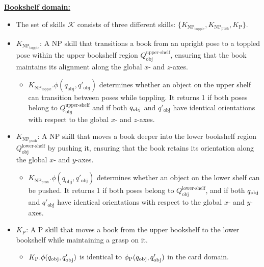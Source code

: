 \underline{\textbf{Bookshelf domain:}} \label{env:bookshelf_skill_descript}
\begin{itemize}
        \item[] The set of skills \(\mathcal{K}\) consists of three different skills: \(\{ K_{\text{NP}_\text{topple}}, K_{\text{NP}_\text{push}}, K_\text{P}\}\). \label{skill:bookshelf_library}
        \item \(K_{\text{NP}_\text{topple}}\): A NP skill that transitions a book from an upright pose to a toppled pose within the upper bookshelf region \(Q^\text{upper-shelf}_\text{obj}\), ensuring that the book maintains its alignment along the global \( x \)- and \( z \)-axes. \label{skill:bookshelf_topple}
        \begin{itemize}
            \item \( K_{\text{NP}_\text{topple}}.\phi(q_{\text{obj}}, q'_{\text{obj}}) \) determines whether an object on the upper shelf can transition between poses while toppling. It returns 1 if both poses belong to \( Q^\text{upper-shelf}_{\text{obj}} \) and if both $q_\text{obj}$ and $q'_\text{obj}$ have identical orientations with respect to the global \( x \)- and \( z \)-axes.
        \end{itemize}
        \item \(K_{\text{NP}_\text{push}}\): A NP skill that moves a book deeper into the lower bookshelf region \(Q^\text{lower-shelf}_\text{obj}\) by pushing it, ensuring that the book retains its orientation along the global \( x \)- and \( y \)-axes. \label{skill:bookshelf_push}
        \begin{itemize}
            \item \( K_{\text{NP}_\text{push}}.\phi(q_{\text{obj}}, q'_{\text{obj}}) \) determines whether an object on the lower shelf can be pushed. It returns 1 if both poses belong to \( Q^\text{lower-shelf}_{\text{obj}} \), and if both $q_\text{obj}$ and $q'_\text{obj}$ have identical orientations with respect to the global \( x \)- and \( y \)-axes.
        \end{itemize}
        \item \(K_\text{P}\): A P skill that moves a book from the upper bookshelf to the lower bookshelf while maintaining a grasp on it. \label{skill:bookshelf_place}
        \begin{itemize}
            \item \( K_{\text{P}}.\phi(q_\text{obj}, q_\text{obj}') \) is identical to \( \phi_\text{P}(q_\text{obj}, q_\text{obj}') \) in the card domain.
        \end{itemize}
\end{itemize}

